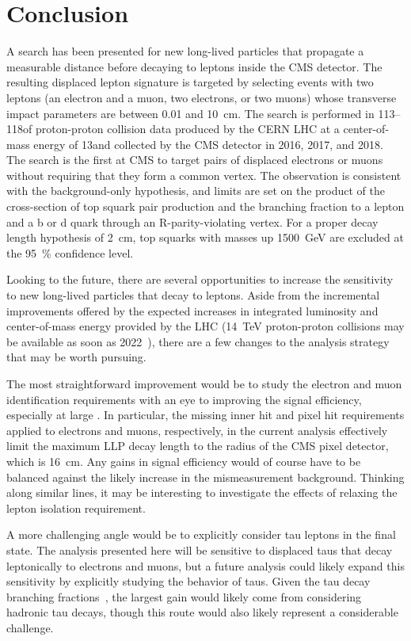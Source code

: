 \chapter{Conclusion}
\label{conclusion}
A search has been presented for new long-lived particles that propagate a measurable distance before decaying to leptons inside the CMS detector. The resulting displaced lepton signature is targeted by selecting events with two leptons (an electron and a muon, two electrons, or two muons) whose transverse impact parameters are between \num{0.01} and \SI{10}{\cm}. The search is performed in 113--118\fbinv of proton-proton collision data produced by the CERN LHC at a center-of-mass energy of 13\TeV and collected by the CMS detector in 2016, 2017, and 2018. The search is the first at CMS to target pairs of displaced electrons or muons without requiring that they form a common vertex. The observation is consistent with the background-only hypothesis, and limits are set on the product of the cross-section of top squark pair production and the branching fraction to a lepton and a b or d quark through an R-parity-violating vertex. For a proper decay length hypothesis of \SI{2}{\cm}, top squarks with masses up \SI{1500}{\GeV} are excluded at the \SI{95}{\percent} confidence level.

Looking to the future, there are several opportunities to increase the sensitivity to new long-lived particles that decay to leptons. Aside from the incremental improvements offered by the expected increases in integrated luminosity and center-of-mass energy provided by the LHC (\SI{14}{\TeV} proton-proton collisions may be available as soon as 2022~\cite{run3_constraints, lhc_schedule}), there are a few changes to the analysis strategy that may be worth pursuing.

The most straightforward improvement would be to study the electron and muon identification requirements with an eye to improving the signal efficiency, especially at large \ad. In particular, the missing inner hit and pixel hit requirements applied to electrons and muons, respectively, in the current analysis effectively limit the maximum LLP decay length to the radius of the CMS pixel detector, which is \SI{16}{\cm}. Any gains in signal efficiency would of course have to be balanced against the likely increase in the mismeasurement background. Thinking along similar lines, it may be interesting to investigate the effects of relaxing the lepton isolation requirement.

A more challenging angle would be to explicitly consider tau leptons in the final state. The analysis presented here will be sensitive to displaced taus that decay leptonically to electrons and muons, but a future analysis could likely expand this sensitivity by explicitly studying the \ad behavior of taus. Given the tau decay branching fractions~\cite{pdg_2020}, the largest gain would likely come from considering hadronic tau decays, though this route would also likely represent a considerable challenge.

